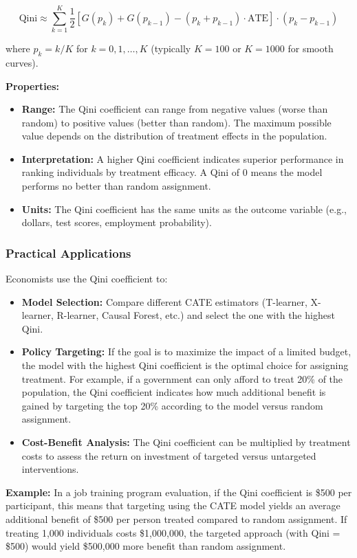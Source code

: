 \documentclass[12pt,a4paper]{article}
\begin{document}
\begin{equation}
\text{Qini} \approx \sum_{k=1}^{K} \frac{1}{2} \left[ G(p_k) + G(p_{k-1}) - (p_k + p_{k-1}) \cdot \text{ATE} \right] \cdot (p_k - p_{k-1})
\end{equation}

where $p_k = k/K$ for $k = 0, 1, \ldots, K$ (typically $K=100$ or $K=1000$ for smooth curves).

\textbf{Properties:}
\begin{itemize}
\item \textbf{Range:} The Qini coefficient can range from negative values (worse than random) to positive values (better than random). The maximum possible value depends on the distribution of treatment effects in the population.
\item \textbf{Interpretation:} A higher Qini coefficient indicates superior performance in ranking individuals by treatment efficacy. A Qini of 0 means the model performs no better than random assignment.
\item \textbf{Units:} The Qini coefficient has the same units as the outcome variable (e.g., dollars, test scores, employment probability).
\end{itemize}

\subsubsection{Practical Applications}

Economists use the Qini coefficient to:
\begin{itemize}
\item \textbf{Model Selection:} Compare different CATE estimators (T-learner, X-learner, R-learner, Causal Forest, etc.) and select the one with the highest Qini.
\item \textbf{Policy Targeting:} If the goal is to maximize the impact of a limited budget, the model with the highest Qini coefficient is the optimal choice for assigning treatment. For example, if a government can only afford to treat 20\% of the population, the Qini coefficient indicates how much additional benefit is gained by targeting the top 20\% according to the model versus random assignment.
\item \textbf{Cost-Benefit Analysis:} The Qini coefficient can be multiplied by treatment costs to assess the return on investment of targeted versus untargeted interventions.
\end{itemize}

\textbf{Example:} In a job training program evaluation, if the Qini coefficient is \$500 per participant, this means that targeting using the CATE model yields an average additional benefit of \$500 per person treated compared to random assignment. If treating 1,000 individuals costs \$1,000,000, the targeted approach (with Qini = \$500) would yield \$500,000 more benefit than random assignment.
\end{document}
